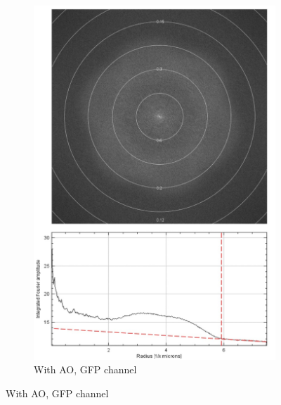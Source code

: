 \begin{figure}
\begin{subfigure}[t]{0.45\textwidth}
		\includegraphics[width=\linewidth]{images/DeepSIM_NMJ_AO_GFP_ft_and_plot.jpg}
		\caption{With AO, GFP channel}
		\label{fig:DeepSIM_NMJ_AO_GFP_ft_and_plot}
	\end{subfigure}
	

\end{figure}
